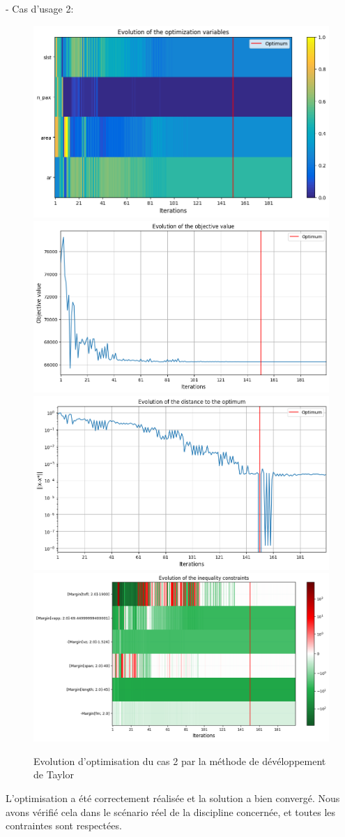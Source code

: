 \documentclass[a4paper, 11pt]{article}
\begin{document}
- Cas d'usage 2:  
\begin{figure}[H]
    \centering
    \includegraphics[width=0.45\linewidth]{Images_case_2/p3u2_taylor.png}
    \includegraphics[width=0.45\linewidth]{Images_case_2/p3u2_taylor_evol_obj.png}
    \includegraphics[width=0.45\linewidth]{Images_case_2/p3u2_taylor_evol_dist.png}
    \includegraphics[width=0.45\linewidth]{Images_case_2/p3u2_taylor_evol_constraint.png}
    \caption{Evolution d'optimisation du cas 2 par la méthode de dévéloppement de Taylor}
    \label{fig:p3u2_taylor}
\end{figure}

L’optimisation a été correctement réalisée et la solution a bien convergé. Nous avons vérifié cela dans le scénario réel de la discipline concernée, et toutes les contraintes sont respectées.

\end{document}
